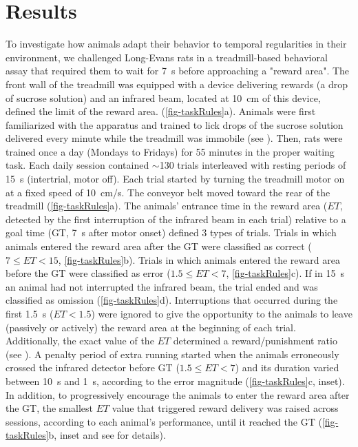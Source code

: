 \section{Results}
\label{ch:time:results}

To investigate how animals adapt their behavior to temporal regularities in their environment, we challenged Long-Evans rats in a treadmill-based behavioral assay that required them to wait for 7~s before approaching a "reward area".
% 
The front wall of the treadmill was equipped with a device delivering rewards (a drop of sucrose solution) and an infrared beam, located at 10~cm of this device, defined the limit of the reward area. (\autoref{fig-taskRules}a).
Animals were first familiarized with the apparatus and trained to lick drops of the sucrose solution delivered every minute while the treadmill was immobile (see ).
Then, rats were trained once a day (Mondays to Fridays) for 55 minutes in the proper waiting task.
Each daily session contained $\sim$130 trials interleaved with resting periods of 15~s (intertrial, motor off).
Each trial started by turning the treadmill motor on at a fixed speed of 10~cm/s.
The conveyor belt moved toward the rear of the treadmill (\autoref{fig-taskRules}a).
The animals' entrance time in the reward area ($ET$, detected by the first interruption of the infrared beam in each trial) relative to a goal time (GT, 7~s after motor onset) defined 3 types of trials.
Trials in which animals entered the reward area after the GT were classified as correct ($7\leq ET<15$, \autoref{fig-taskRules}b).
Trials in which animals entered the reward area before the GT were classified as error ($1.5\leq ET<7$, \autoref{fig-taskRules}c).
If in 15~s an animal had not interrupted the infrared beam, the trial ended and was classified as omission (\autoref{fig-taskRules}d).
Interruptions that occurred during the first 1.5~s ($ET<1.5$) were ignored to give the opportunity to the animals to leave (passively or actively) the reward area at the beginning of each trial.
Additionally, the exact value of the $ET$ determined a reward/punishment ratio (see ). 
A penalty period of extra running started when the animals erroneously crossed the infrared detector before GT ($1.5\leq ET<7$) and its duration varied between 10~s and 1~s, according to the error magnitude (\autoref{fig-taskRules}c, inset).
In addition, to progressively encourage the animals to enter the reward area after the GT, the smallest $ET$ value that triggered reward delivery was raised across sessions, according to each animal's performance, until it reached the GT (\autoref{fig-taskRules}b, inset and see  for details).
